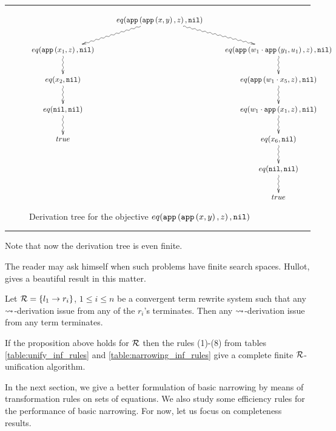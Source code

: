 \begin{landscape}
	\thispagestyle{empty}
	\hrule
	\begin{figure}[!ht]
		\begin{displaymath}
			\xymatrix{
				& eq(\appFunc{\appFunc{x}{y}}{z}, \nilList) \ar@{~>}[dr] \ar@{~>}[dl] \\
				eq(\appFunc{x_1}{z},\nilList) \ar@{~>}[d] & & eq(\appFunc{w_1 \cdot \appFunc{y_1}{u_1}}{z}, \nilList) \ar@{~>}[d]\\
				eq(x_2,\nilList) \ar@{~>}[d] & & eq(\appFunc{w_1 \cdot x_5}{z}, \nilList) \ar@{~>}[d]\\
				eq(\nilList, \nilList) \ar@{~>}[d]& & eq(w_1 \cdot \appFunc{x_1}{z}, \nilList) \ar@{~>}[d]\\
				true & & eq(x_6, \nilList) \ar@{~>}[d]\\
				& & eq(\nilList, \nilList) \ar@{~>}[d]\\
				& & true
			}
		\end{displaymath}
		\caption{Derivation tree for the objective $eq(\mathtt{app}\left(\mathtt{app}\left(x,y\right),z\right), \mathtt{nil})$}
		\label{figure:example:app:derivation-tree-basic-narrowing}
	\end{figure}
	\hrule
	\vspace{1cm}
	Note that now the derivation tree is even finite.
\end{landscape}

The reader may ask himself when such problems have finite search spaces. Hullot, \cite{hullot:cfunif} gives a beautiful result in this matter.

\begin{proposition}\label{proposition:narrowing-as-E-unification}
	Let $\mathcal{R} = \{ l_1 \rightarrow r_i \}$, $1 \leq i \leq n$ be a convergent term rewrite system such that any $\mathbin{\rightsquigarrow}$-derivation issue from any of the $r_i$'s terminates. Then any $\mathbin{\rightsquigarrow}$-derivation issue from any term terminates.
\end{proposition}

If the proposition above holds for $\mathcal{R}$ then the rules (1)-(8) from tables \ref{table:unify_inf_rules} and \ref{table:narrowing_inf_rules} give a complete finite $\mathcal{R}$-unification algorithm.

In the next section, we give a better formulation of basic narrowing by means of transformation rules on sets of equations. We also study some efficiency rules for the performance of basic narrowing. For now, let us focus on completeness results.


